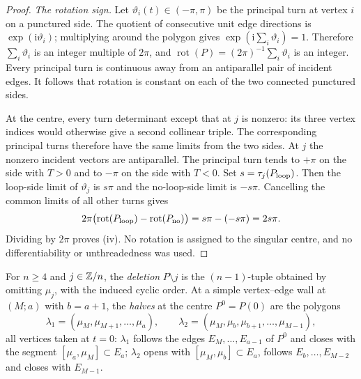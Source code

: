 \begin{proof}
\emph{The rotation sign.}
Let $\vartheta_i(t)\in(-\pi,\pi)$ be the principal turn at vertex $i$
on a punctured side. The quotient of consecutive unit edge directions
is $\exp(\mathrm i\vartheta_i)$; multiplying around the polygon gives
$\exp(\mathrm i\sum_i\vartheta_i)=1$. Therefore
$\sum_i\vartheta_i$ is an integer multiple of $2\pi$, and
$\operatorname{rot}(P)=(2\pi)^{-1}\sum_i\vartheta_i$ is an integer.
Every principal turn is continuous away from an antiparallel pair of
incident edges. It follows that rotation is constant on each of the two
connected punctured sides.

At the centre, every turn determinant except that at $j$ is nonzero:
its three vertex indices would otherwise give a second collinear triple.
The corresponding principal turns therefore have the same limits from
the two sides. At $j$ the nonzero incident vectors are antiparallel.
The principal turn tends to $+\pi$ on the side with $T>0$ and to
$-\pi$ on the side with $T<0$. Set $s=\tau_j(P_{\rm loop})$.
Then the loop-side limit of $\vartheta_j$ is $s\pi$ and the no-loop-side
limit is $-s\pi$. Cancelling the common limits of all other turns gives
\begin{equation}\label{cusppr:rotation-limits}
2\pi\bigl(\operatorname{rot}(P_{\rm loop})-
                 \operatorname{rot}(P_{\rm no})\bigr)
=s\pi-(-s\pi)=2s\pi.
\end{equation}
Dividing by $2\pi$ proves (iv). No rotation is assigned to the singular
centre, and no differentiability or unthreadedness was used.
\end{proof}

\begin{definition}\label{def:deletion-halves}
For $n\geq4$ and $j\in\mathbb Z/n$, the \emph{deletion} $P\setminus j$ is the
$(n-1)$-tuple obtained by omitting $\mu_j$, with the induced cyclic order.
At a simple vertex--edge wall at $(M;a)$ with $b=a+1$, the \emph{halves} at
the centre $P^0=P(0)$ are the polygons
\[
\lambda_1=(\mu_M,\mu_{M+1},\ldots,\mu_a),\qquad
\lambda_2=(\mu_M,\mu_b,\mu_{b+1},\ldots,\mu_{M-1}),
\]
all vertices taken at $t=0$: $\lambda_1$ follows the edges $E_M,\ldots,E_{a-1}$
of $P^0$ and closes with the segment $[\mu_a,\mu_M]\subset E_a$; $\lambda_2$
opens with $[\mu_M,\mu_b]\subset E_a$, follows $E_b,\ldots,E_{M-2}$ and closes
with $E_{M-1}$.
\end{definition}

